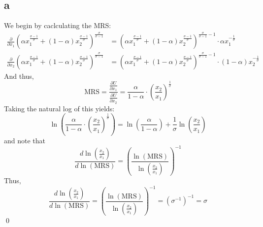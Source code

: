 \documentclass[12pt]{article}
\begin{document}
\subsection*{a}
We begin by caclculating the MRS:
\begin{align*}
    \frac{\partial}{\partial x_1}\left( \alpha x_1^{\frac{\sigma-1}{\sigma}} + (1-\alpha)x_2^{\frac{\sigma -1}{\sigma}} \right)^{\frac{\sigma}{\sigma -1}} &= \left( \alpha x_1^{\frac{\sigma-1}{\sigma}} + (1-\alpha)x_2^{\frac{\sigma -1}{\sigma}} \right)^{\frac{\sigma}{\sigma -1} -1 } \cdot \alpha x_1^{-\frac{1}{\sigma}}\\
    \frac{\partial}{\partial x_2}\left( \alpha x_1^{\frac{\sigma-1}{\sigma}} + (1-\alpha)x_2^{\frac{\sigma -1}{\sigma}} \right)^{\frac{\sigma}{\sigma -1}} &= \left( \alpha x_1^{\frac{\sigma-1}{\sigma}} + (1-\alpha)x_2^{\frac{\sigma -1}{\sigma}} \right)^{\frac{\sigma}{\sigma -1} -1} \cdot (1-\alpha) x_2^{-\frac{1}{\sigma}}
\end{align*}
And thus, 
\[
\text{MRS} = \frac{\frac{\partial U}{\partial x_1}}{\frac{\partial U}{\partial x_2}} = \frac{\alpha}{1-\alpha} \cdot \left( \frac{x_2}{x_1} \right)^{\frac{1}{\sigma}} 
\]
Taking the natural log of this yields:
\[
\ln \left( \frac{\alpha}{1-\alpha} \cdot \left( \frac{x_2}{x_1} \right)^{\frac{1}{\sigma}} \right) = \ln \left( \frac{\alpha}{1-\alpha} \right) + \frac{1}{\sigma} \ln \left( \frac{x_2}{x_1} \right) 
\]
and note that 
\[
\frac{d \ln \left( \frac{x_2}{x_1} \right)}{d \ln(\text{MRS})} = \left( \frac{\ln (\text{MRS})}{\ln \left( \frac{x_2}{x_1} \right)} \right)^{-1}
\]
Thus, 
\[
\frac{d \ln \left( \frac{x_2}{x_1} \right)}{d \ln(\text{MRS})} = \left( \frac{\ln (\text{MRS})}{\ln \left( \frac{x_2}{x_1} \right)} \right)^{-1} = (\sigma^{-1})^{-1} = \sigma
\]
\qed
\end{document}
